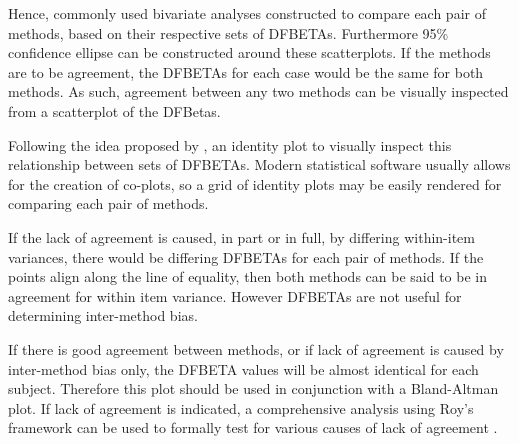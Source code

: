 \documentclass[12pt, a4paper]{report}
\theoremstyle{plain}
\theoremstyle{definition}
\theoremstyle{remark}
\begin{document}
Hence, commonly used bivariate analyses constructed to compare each pair of methods, based on their respective sets of DFBETAs. Furthermore 95\% confidence ellipse can be constructed around these scatterplots. If the methods are to be agreement, the DFBETAs for each case would be the same for both methods. As such, agreement between any two methods can be visually inspected from a scatterplot of the DFBetas. 



Following the idea proposed by \citet{BA86}, an identity plot to visually inspect this relationship between sets of DFBETAs. Modern statistical software usually allows for the creation of co-plots, so a grid of identity plots may be easily rendered for comparing each pair of methods.

If the lack of agreement is caused, in part or in full, by differing within-item variances, there would be differing DFBETAs for each pair of methods. If the points align along the line of equality, then both methods can be said to be in agreement for within item variance. However DFBETAs are not useful for determining inter-method bias. 

If there is good agreement between methods, or if lack of agreement is caused by inter-method bias only, the DFBETA values will be almost identical for each subject. Therefore this plot should be used in conjunction with a Bland-Altman plot. If lack of agreement is indicated, a comprehensive analysis using Roy's framework can be used to formally test for various causes of lack of agreement \citep{ARoy2009}.
\end{document}
